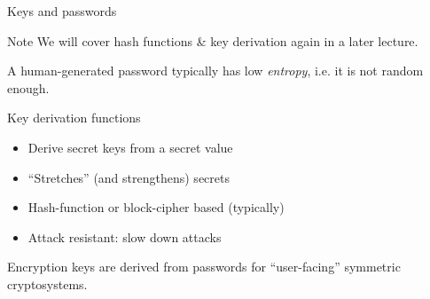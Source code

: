 \begin{frame}{Keys and passwords}
  \begin{block}{Note}
    We will cover hash functions \& key derivation again in a later lecture.
  \end{block}

  \pause
  A human-generated password typically has low \emph{entropy}, i.e. it is not random enough.

  \pause
  Key derivation functions
  \begin{itemize}[<+(1)->]
    \item Derive secret keys from a secret value
    \item \enquote{Stretches} (and strengthens) secrets
    \item Hash-function or block-cipher based (typically)
    \item Attack resistant: slow down attacks
  \end{itemize}

  \pause
  Encryption keys are derived from passwords for \enquote{user-facing} symmetric cryptosystems.
\end{frame}


